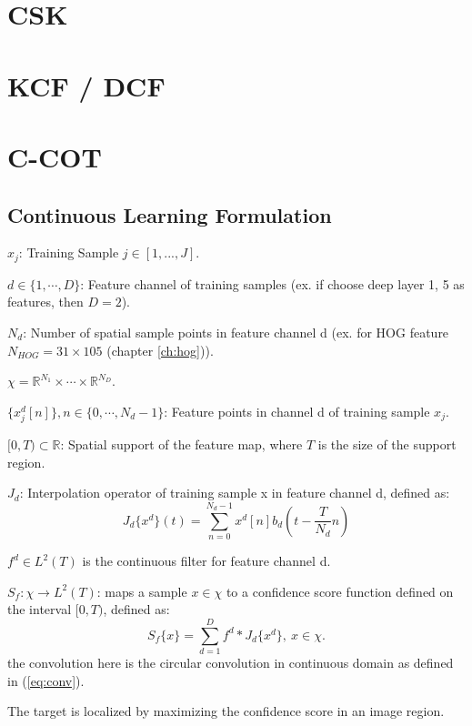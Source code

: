 \documentclass[12pt]{article}
\numberwithin{equation}{section}
\begin{document}
\section{CSK \cite{henriques2012exploiting}}

\section{KCF / DCF \cite{henriques2015high}}

\section{C-COT \cite{DanelljanECCV2016}} \label{ch:ccot}
\subsection{Continuous Learning Formulation}
$x_j$: Training Sample $j \in [1, ..., J]$. \par
$d \in \{1, \cdots , D\}$: Feature channel of training samples (ex. if choose deep layer 1, 5 as features, then $D = 2$). \par
$N_d$: Number of spatial sample points in feature channel d (ex. for HOG feature $N_{HOG}=31 \times 105$ (chapter \ref{ch:hog})). \par
$\chi=\mathbb{R}^{N_1} \times \cdots \times \mathbb{R}^{N_D}$. \par
$\{x^d_j[n]\}, n \in \{0, \cdots, N_d -1\}$: Feature points in channel d of training sample $x_j$.\par
$[0, T) \subset \mathbb{R} $: Spatial support of the feature map, where $T$ is the size of the support region.\par
$J_d$: Interpolation operator of training sample x in feature channel d, defined as: 
\begin{equation}
	J_d\{x^d\}(t)=\sum^{N_d-1}_{n=0} x^d[n] b_d(t-\frac{T}{N_d} n)
\end{equation} \par
$f^d \in L^2(T)$ is the continuous filter for feature channel d. \par
$S_f: \chi \rightarrow L^2(T)$: maps a sample $x \in \chi$ to a confidence score function defined on the interval $[0, T)$, defined as: 
\begin{equation} \label{eq:score}
	S_f\{x\}=\sum^D_{d=1} f^d * J_d\{x^d\}, \  x \in \chi.
\end{equation} 
the convolution here is the circular convolution in continuous domain as defined in (\ref{eq:conv}). \par
The target is localized by maximizing the confidence score in an image region. \par
\end{document}
